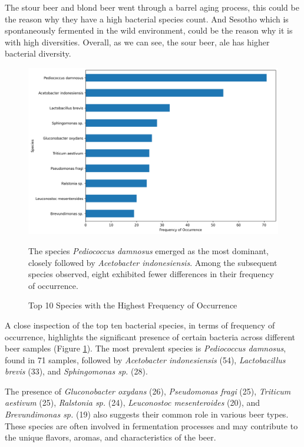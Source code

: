 The stour beer and blond beer went through a barrel aging process, this could be the reason why they have a high bacterial species count. And Sesotho which is spontaneously fermented in the wild environment, could be the reason why it is with high diversities. Overall, as we can see, the sour beer, ale has higher bacterial diversity.

    \begin{figure}[H]
        \centering
        \includegraphics[scale=0.5]{images/overview/top10_species_bac.png}
        \caption{Top 10 Species with the Highest Frequency of Occurrence}
        \small The species \textit{Pediococcus damnosus} emerged as the most dominant, closely followed by \textit{Acetobacter indonesiensis}. Among the subsequent species observed, eight exhibited fewer differences in their frequency of occurrence.
        \label{fig:methods:top10_species_bac}
    \end{figure}
    
A close inspection of the top ten bacterial species, in terms of frequency of occurrence, highlights the significant presence of certain bacteria across different beer samples (Figure \ref{fig:methods:top10_species_bac}). The most prevalent species is \textit{Pediococcus damnosus}, found in 71 samples, followed by \textit{Acetobacter indonesiensis} (54), \textit{Lactobacillus brevis} (33), and \textit{Sphingomonas sp.} (28).

The presence of \textit{Gluconobacter oxydans} (26), \textit{Pseudomonas fragi} (25), \textit{Triticum aestivum} (25), \textit{Ralstonia sp.} (24), \textit{Leuconostoc mesenteroides} (20), and \textit{Brevundimonas sp.} (19) also suggests their common role in various beer types. These species are often involved in fermentation processes and may contribute to the unique flavors, aromas, and characteristics of the beer.


